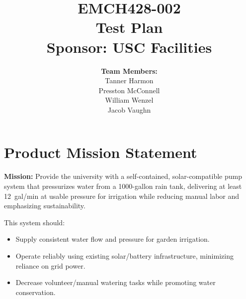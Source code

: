 \documentclass[12pt]{article}
\begin{document}
\onehalfspacing

\title{
    \vspace{2in}
    \textbf{EMCH428-002} \\[1ex]
    \textbf{Test Plan} \\[1ex]
    \textbf{Sponsor: USC Facilities} \\[1ex]
    \vspace{2in}
}

\author{
    \textbf{Team Members:} \\[2ex]
    Tanner Harmon\\[1ex]
    Presston McConnell\\[1ex]
    William Wenzel\\[1ex]
    Jacob Vaughn\\[2ex]
}

\date{}

\maketitle
\thispagestyle{fancy}

\newpage

\setcounter{page}{2} %

\section*{Product Mission Statement}
\textbf{Mission:} 
Provide the university with a self-contained, solar-compatible pump system that pressurizes water from a 1000-gallon rain tank, delivering at least 12~gal/min at usable pressure for irrigation while reducing manual labor and emphasizing sustainability.

\noindent
This system should:
\begin{itemize}
    \item Supply consistent water flow and pressure for garden irrigation.
    \item Operate reliably using existing solar/battery infrastructure, minimizing reliance on grid power.
    \item Decrease volunteer/manual watering tasks while promoting water conservation.
\end{itemize}


\end{document}

